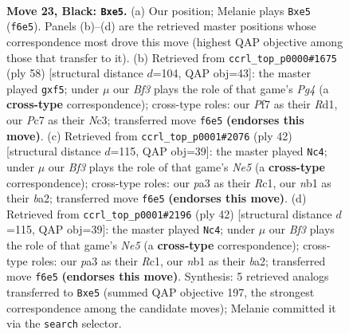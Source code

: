 \documentclass[11pt]{article}
\begin{document}
\clearpage

\begin{figure}[p]\centering
\begin{subfigure}{0.46\textwidth}\centering
\resizebox{\linewidth}{!}{%
\newchessgame
\chessboard[
  setfen={1r2n1k1/2p2ppp/p2p1b2/4PP1b/2P4n/PB6/6P1/RNB1R1K1 b - - 0 23},
  showmover=false,
  pgfstyle=straightmove, color=movearrow, markmove={f6-e5}
]}
\caption{}
\end{subfigure}\hfill
\begin{subfigure}{0.46\textwidth}\centering
\resizebox{\linewidth}{!}{%
\newchessgame
\chessboard[
  setfen={1k1rb3/1p1n3p/p2p2p1/P2P1p2/1P3RP1/1KNBr2P/2P5/3R4 w - - 1 30},
  showmover=false,
  pgfstyle=straightmove, color=movearrow, markmove={g4-f5}
]}
\caption{}
\end{subfigure}
\\[4pt]
\begin{subfigure}{0.46\textwidth}\centering
\resizebox{\linewidth}{!}{%
\newchessgame
\chessboard[
  setfen={r2r2k1/1p3ppp/3b1n2/p3N3/1P3N2/P2BP3/bR3PPP/2R3K1 w - - 3 22},
  showmover=false,
  pgfstyle=straightmove, color=movearrow, markmove={e5-c4}
]}
\caption{}
\end{subfigure}\hfill
\begin{subfigure}{0.46\textwidth}\centering
\resizebox{\linewidth}{!}{%
\newchessgame
\chessboard[
  setfen={r2r2k1/1p3ppp/3b1n2/p3N3/1P3N2/P2BP3/bR3PPP/2R3K1 w - - 3 22},
  showmover=false,
  pgfstyle=straightmove, color=movearrow, markmove={e5-c4}
]}
\caption{}
\end{subfigure}
\caption{\textbf{Move 23, Black: \texttt{Bxe5}.} (a) Our position; Melanie plays \texttt{Bxe5} (\texttt{f6e5}). Panels (b)--(d) are the retrieved master positions whose correspondence most drove this move (highest QAP objective among those that transfer to it). (b) Retrieved from \texttt{ccrl\_top\_p0000\#1675} (ply 58) [structural distance $d$=104, QAP obj=43]: the master played \texttt{gxf5}; under $\mu$ our \emph{Bf3} plays the role of that game's \emph{Pg4} (a \textbf{cross-type} correspondence); cross-type roles: our \emph{P}f7 as their \emph{R}d1, our \emph{P}c7 as their \emph{N}c3; transferred move \texttt{f6e5} \textbf{(endorses this move)}. (c) Retrieved from \texttt{ccrl\_top\_p0001\#2076} (ply 42) [structural distance $d$=115, QAP obj=39]: the master played \texttt{Nc4}; under $\mu$ our \emph{Bf3} plays the role of that game's \emph{Ne5} (a \textbf{cross-type} correspondence); cross-type roles: our \emph{p}a3 as their \emph{R}c1, our \emph{n}b1 as their \emph{b}a2; transferred move \texttt{f6e5} \textbf{(endorses this move)}. (d) Retrieved from \texttt{ccrl\_top\_p0001\#2196} (ply 42) [structural distance $d$=115, QAP obj=39]: the master played \texttt{Nc4}; under $\mu$ our \emph{Bf3} plays the role of that game's \emph{Ne5} (a \textbf{cross-type} correspondence); cross-type roles: our \emph{p}a3 as their \emph{R}c1, our \emph{n}b1 as their \emph{b}a2; transferred move \texttt{f6e5} \textbf{(endorses this move)}. Synthesis: 5 retrieved analogs transferred to \texttt{Bxe5} (summed QAP objective 197, the strongest correspondence among the candidate moves); Melanie committed it via the \texttt{search} selector.}
\label{fig:thought-m45}
\end{figure}
\end{document}
